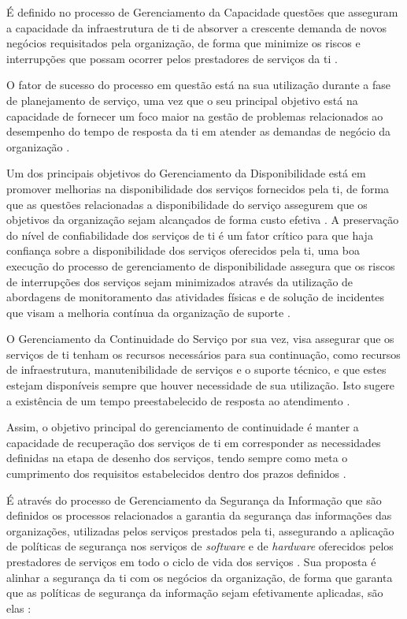É definido no processo de Gerenciamento da Capacidade questões que asseguram a capacidade da infraestrutura de \acrshort{ti} de absorver a crescente demanda de novos negócios requisitados pela organização, de forma que minimize os riscos e interrupções que possam ocorrer pelos prestadores de serviços da \acrshort{ti} \cite{abreu2012implantando}.

O fator de sucesso do processo em questão está na sua utilização durante a fase de planejamento de serviço, uma vez que o seu principal objetivo está na capacidade de fornecer um foco maior na gestão de problemas relacionados ao desempenho do tempo de resposta da \acrshort{ti} em atender as demandas de negócio da organização \cite{introductoryoverviewofitil}.

Um dos principais objetivos do Gerenciamento da Disponibilidade está em promover melhorias na disponibilidade dos serviços fornecidos pela \acrshort{ti}, de forma que as questões relacionadas a disponibilidade do serviço assegurem que os objetivos da organização sejam alcançados de forma custo efetiva \cite{introductoryoverviewofitil}. A preservação do nível de confiabilidade dos serviços de \acrshort{ti} é um fator crítico para que haja confiança sobre a disponibilidade dos serviços oferecidos pela \acrshort{ti}, uma boa execução do processo de gerenciamento de disponibilidade assegura que os riscos de interrupções dos serviços sejam minimizados através da utilização de abordagens de monitoramento das atividades físicas e de solução de incidentes que visam a melhoria contínua da organização de suporte \cite{abreu2012implantando}.

O Gerenciamento da Continuidade do Serviço por sua vez, visa assegurar que os serviços de \acrshort{ti} tenham os recursos necessários para sua continuação, como recursos de infraestrutura, manutenibilidade de serviços e o suporte técnico, e que estes estejam disponíveis sempre que houver necessidade de sua utilização. Isto sugere a existência de um tempo preestabelecido de resposta ao atendimento \cite{abreu2012implantando}.

Assim, o objetivo principal do gerenciamento de continuidade é manter a capacidade de recuperação dos serviços de \acrshort{ti} em corresponder as necessidades definidas na etapa de desenho dos serviços, tendo sempre como meta o cumprimento dos requisitos estabelecidos dentro dos prazos definidos \cite{introductoryoverviewofitil}.

É através do processo de Gerenciamento da Segurança da Informação que são definidos os processos relacionados a garantia da segurança das informações das organizações, utilizadas pelos serviços prestados pela \acrshort{ti}, assegurando a aplicação de políticas de segurança nos serviços de \textit{software} e de \textit{hardware} oferecidos pelos prestadores de serviços em todo o ciclo de vida dos serviços \cite{abreu2012implantando}. Sua proposta é alinhar a segurança da \acrshort{ti} com os negócios da organização, de forma que garanta que as políticas de segurança da informação sejam efetivamente aplicadas, são elas \cite{introductoryoverviewofitil}:

